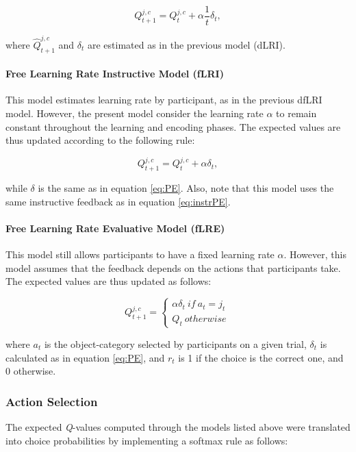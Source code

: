 \documentclass[a4paper,12pt]{article}
\begin{document}
\begin{equation}
{Q}_{t+1}^{j,c} = {Q}_{t}^{j,c}  + {\alpha}  \dfrac{1}{t} \delta_{t},
\label{eq:fLRI}
\end{equation}

\noindent
where $\hat{Q}_{t+1}^{j,c}$ and $\delta_t$ are estimated as in the previous model (dLRI). 

\paragraph{Free Learning Rate Instructive Model (fLRI)} This model estimates learning rate by participant, as in the previous dfLRI model. However, the present model consider the learning rate $\alpha$ to remain constant throughout the learning and encoding phases. The expected values are thus updated according to the following rule: 

\begin{equation}
{Q}_{t+1}^{j,c} = {Q}_{t}^{j,c}  + {\alpha} \delta_{t},
\label{eq:fLRI}
\end{equation}

\noindent
while $\delta$ is the same as in equation \ref{eq:PE}. Also, note that this model uses the same instructive feedback as in equation \ref{eq:instrPE}.

\paragraph{Free Learning Rate Evaluative Model (fLRE)} This model still allows participants to have a fixed learning rate $\alpha$. However, this model assumes that the feedback depends on the actions that participants take. The expected values are thus updated as follows:


\begin{equation}
{Q}_{t+1}^{j,c} = \begin{cases}
{\alpha} \delta_{t}\ if  \ a_t = j_t \  \\ 
{Q}_{t} \ otherwise
\end{cases}
\end{equation}

\noindent
where $a_t$ is the object-category selected by participants on a given trial, $\delta_{t}$ is calculated as in equation \ref{eq:PE}, and $r_t$ is 1 if the choice is the correct one, and 0 otherwise. 

\subsubsection{Action Selection} The expected \textit{Q}-values computed through the models listed above were translated into choice probabilities by implementing a softmax rule as follows: 
\end{document}
